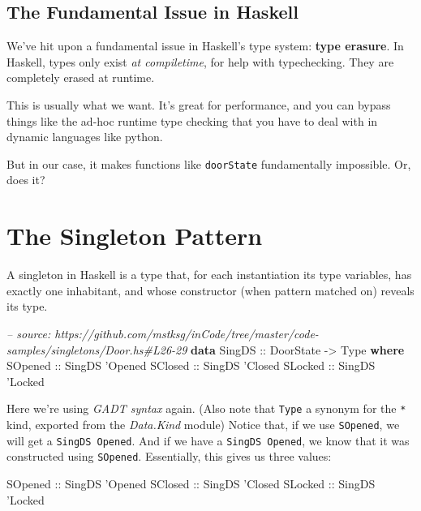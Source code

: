 \documentclass[]{article}
\newenvironment{Shaded}{}{}
\newcommand{\KeywordTok}[1]{\textcolor[rgb]{0.00,0.44,0.13}{\textbf{#1}}}
\newcommand{\DataTypeTok}[1]{\textcolor[rgb]{0.56,0.13,0.00}{#1}}
\newcommand{\CharTok}[1]{\textcolor[rgb]{0.25,0.44,0.63}{#1}}
\newcommand{\CommentTok}[1]{\textcolor[rgb]{0.38,0.63,0.69}{\textit{#1}}}
\newcommand{\OtherTok}[1]{\textcolor[rgb]{0.00,0.44,0.13}{#1}}
\begin{document}
\subsection{The Fundamental Issue in
Haskell}\label{the-fundamental-issue-in-haskell}

We've hit upon a fundamental issue in Haskell's type system: \textbf{type
erasure}. In Haskell, types only exist \emph{at compiletime}, for help with
typechecking. They are completely erased at runtime.

This is usually what we want. It's great for performance, and you can bypass
things like the ad-hoc runtime type checking that you have to deal with in
dynamic languages like python.

But in our case, it makes functions like \texttt{doorState} fundamentally
impossible. Or, does it?

\section{The Singleton Pattern}\label{the-singleton-pattern}

A singleton in Haskell is a type that, for each instantiation its type
variables, has exactly one inhabitant, and whose constructor (when pattern
matched on) reveals its type.

\begin{Shaded}
\begin{Highlighting}[]
\CommentTok{-- source: https://github.com/mstksg/inCode/tree/master/code-samples/singletons/Door.hs#L26-29}
\KeywordTok{data} \DataTypeTok{SingDS}\OtherTok{ ::} \DataTypeTok{DoorState} \OtherTok{->} \DataTypeTok{Type} \KeywordTok{where}
    \DataTypeTok{SOpened}\OtherTok{ ::} \DataTypeTok{SingDS} \CharTok{'Opened}
    \DataTypeTok{SClosed}\OtherTok{ ::} \DataTypeTok{SingDS} \CharTok{'Closed}
    \DataTypeTok{SLocked}\OtherTok{ ::} \DataTypeTok{SingDS} \CharTok{'Locked}
\end{Highlighting}
\end{Shaded}

Here we're using \emph{GADT syntax} again. (Also note that \texttt{Type} a
synonym for the \texttt{*} kind, exported from the \emph{Data.Kind} module)
Notice that, if we use \texttt{SOpened}, we will get a
\texttt{SingDS\ \textquotesingle{}Opened}. And if we have a
\texttt{SingDS\ \textquotesingle{}Opened}, we know that it was constructed using
\texttt{SOpened}. Essentially, this gives us three values:

\begin{Shaded}
\begin{Highlighting}[]
\DataTypeTok{SOpened}\OtherTok{ ::} \DataTypeTok{SingDS} \CharTok{'Opened}
\DataTypeTok{SClosed}\OtherTok{ ::} \DataTypeTok{SingDS} \CharTok{'Closed}
\DataTypeTok{SLocked}\OtherTok{ ::} \DataTypeTok{SingDS} \CharTok{'Locked}
\end{Highlighting}
\end{Shaded}
\end{document}
